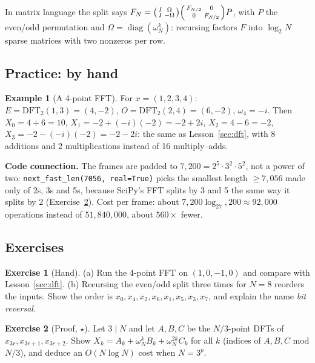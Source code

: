 \documentclass[11pt]{article}
\theoremstyle{definition}
\newtheorem{example}[theorem]{Example}
\newtheorem{innerexercise}{Exercise}[section]
\newenvironment{exercise}[1][]{\begin{innerexercise}[#1]}{\end{innerexercise}}
\newcommand{\diag}{\operatorname{diag}}
\newcommand{\code}[1]{\texttt{#1}}
\begin{document}
In matrix language the split says
$F_N=\begin{psmallmatrix}I&\Omega\\I&-\Omega\end{psmallmatrix}
\begin{psmallmatrix}F_{N/2}&0\\0&F_{N/2}\end{psmallmatrix}P$, with $P$ the
even/odd permutation and $\Omega=\diag(\omega_N^k)$: recursing factors $F$ into
$\log_2N$ sparse matrices with two nonzeros per row.

\subsection{Practice: by hand}

\begin{example}[A 4-point FFT]
For $x=(1,2,3,4)$: $E=\mathrm{DFT}_2(1,3)=(4,-2)$, $O=\mathrm{DFT}_2(2,4)=(6,-2)$,
$\omega_4=-i$. Then $X_0=4+6=10$, $X_1=-2+(-i)(-2)=-2+2i$, $X_2=4-6=-2$,
$X_3=-2-(-i)(-2)=-2-2i$: the same as Lesson~\ref{sec:dft}, with 8 additions and 2 multiplications
instead of 16 multiply--adds.
\end{example}

\begin{connection}
\textbf{Code connection.} The frames are padded to $7{,}200=2^5\cdot3^2\cdot5^2$, not a
power of two: \code{next\_fast\_len(7056, real=True)} picks the smallest length
$\ge7{,}056$ made only of 2s, 3s and 5s, because SciPy's FFT splits by 3 and 5 the same
way it splits by 2 (Exercise~\ref{ex:radix3}). Cost per frame: about
$7{,}200\log_27{,}200\approx92{,}000$ operations instead of $51{,}840{,}000$, about
$560\times$ fewer.
\end{connection}

\subsection{Exercises}
\begin{exercise}[Hand]\label{ex:fft4}
(a) Run the 4-point FFT on $(1,0,-1,0)$ and compare with Lesson~\ref{sec:dft}.
(b) Recursing the even/odd split three times for $N=8$ reorders the inputs. Show the
order is $x_0,x_4,x_2,x_6,x_1,x_5,x_3,x_7$, and explain the name \emph{bit reversal}.
\end{exercise}

\begin{exercise}[Proof, $\star$]\label{ex:radix3}
Let $3\mid N$ and let $A,B,C$ be the $N/3$-point DFTs of $x_{3r},x_{3r+1},x_{3r+2}$.
Show $X_k=A_k+\omega_N^kB_k+\omega_N^{2k}C_k$ for all $k$ (indices of $A,B,C$ mod
$N/3$), and deduce an $O(N\log N)$ cost when $N=3^p$.
\end{exercise}
\end{document}

